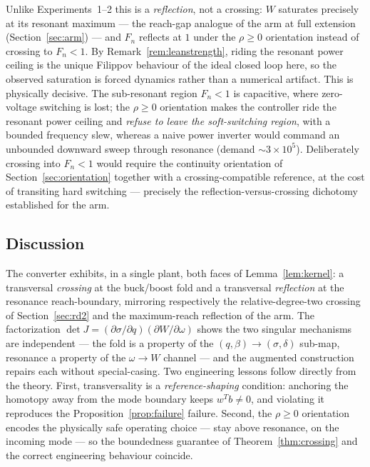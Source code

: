 \documentclass[11pt,american]{article}
\theoremstyle{definition}
\theoremstyle{plain}
\theoremstyle{remark}
\begin{document}
Unlike Experiments~1--2 this is a \emph{reflection}, not a crossing: $W$ saturates precisely at its resonant maximum --- the reach-gap analogue of the arm at full extension (Section~\ref{sec:arm}) --- and $F_n$ reflects at $1$ under the $\rho\ge 0$ orientation instead of crossing to $F_n<1$. By Remark~\ref{rem:leanstrength}, riding the resonant power ceiling is the unique Filippov behaviour of the ideal closed loop here, so the observed saturation is forced dynamics rather than a numerical artifact. This is physically decisive. The sub-resonant region $F_n<1$ is capacitive, where zero-voltage switching is lost; the $\rho\ge 0$ orientation makes the controller ride the resonant power ceiling and \emph{refuse to leave the soft-switching region}, with a bounded frequency slew, whereas a naive power inverter would command an unbounded downward sweep through resonance (demand $\sim 3\times 10^5$). Deliberately crossing into $F_n<1$ would require the continuity orientation of Section~\ref{sec:orientation} together with a crossing-compatible reference, at the cost of transiting hard switching --- precisely the reflection-versus-crossing dichotomy established for the arm.

\subsection{Discussion}

The converter exhibits, in a single plant, both faces of Lemma~\ref{lem:kernel}: a transversal \emph{crossing} at the buck/boost fold and a transversal \emph{reflection} at the resonance reach-boundary, mirroring respectively the relative-degree-two crossing of Section~\ref{sec:rd2} and the maximum-reach reflection of the arm. The factorization $\det J = (\partial\sigma/\partial q)(\partial W/\partial\omega)$ shows the two singular mechanisms are independent --- the fold is a property of the $(q,\beta)\to(\sigma,\delta)$ sub-map, resonance a property of the $\omega\to W$ channel --- and the augmented construction repairs each without special-casing. Two engineering lessons follow directly from the theory. First, transversality is a \emph{reference-shaping} condition: anchoring the homotopy away from the mode boundary keeps $w^T b \ne 0$, and violating it reproduces the Proposition~\ref{prop:failure} failure. Second, the $\rho \ge 0$ orientation encodes the physically safe operating choice --- stay above resonance, on the incoming mode --- so the boundedness guarantee of Theorem~\ref{thm:crossing} and the correct engineering behaviour coincide.
\end{document}
